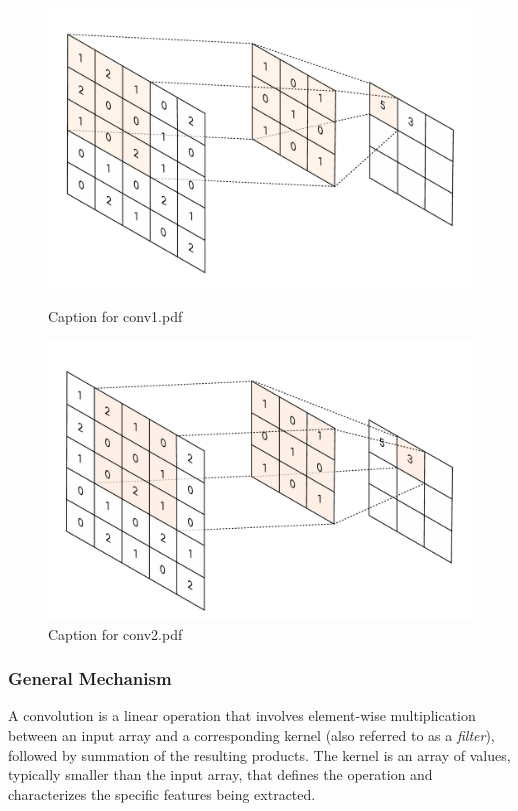 \documentclass{pracalicmgr}
\begin{document}
\begin{figure}[H]
    \centering
    \begin{minipage}[t]{0.48\textwidth}
        \centering
        \includegraphics[width=\textwidth]{src/conv1.pdf}
        \caption{Caption for conv1.pdf}
    \end{minipage}
    \hfill
    \begin{minipage}[t]{0.48\textwidth}
        \centering
        \includegraphics[width=\textwidth]{src/conv2.pdf}
        \caption{Caption for conv2.pdf}
    \end{minipage}
\end{figure}

\subsubsection{General Mechanism}

A convolution is a linear operation that involves element-wise multiplication between an input array and a corresponding kernel (also referred to as a \textit{filter}), followed by summation of the resulting products. The kernel is an array of values, typically smaller than the input array, that defines the operation and characterizes the specific features being extracted.
\end{document}
